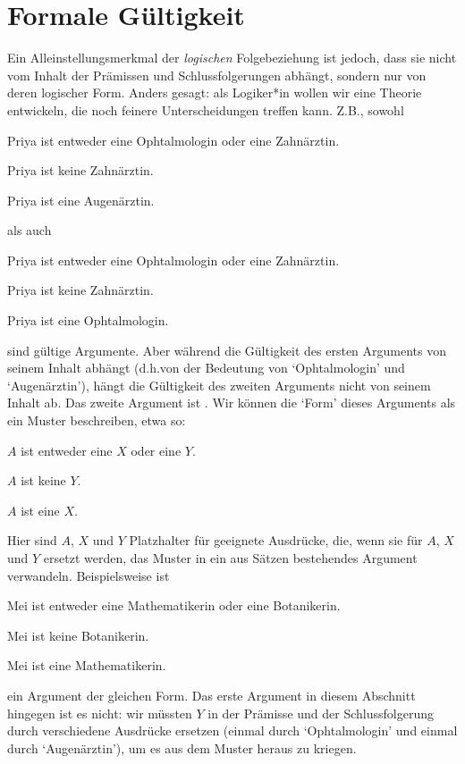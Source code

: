 \section{Formale Gültigkeit}

Ein Alleinstellungsmerkmal der \emph{logischen} Folgebeziehung ist jedoch, dass sie nicht vom Inhalt der Prämissen und Schlussfolgerungen abhängt, sondern nur von deren logischer Form. Anders gesagt: als Logiker*in wollen wir eine Theorie entwickeln, die noch feinere Unterscheidungen treffen kann. Z.B.\@, sowohl
\begin{earg}
	\item[] Priya ist entweder eine Ophtalmologin oder eine Zahnärztin.
	\item[] Priya ist keine Zahnärztin.
	\item[\therefore] Priya ist eine Augenärztin.
\end{earg}
als auch
\begin{earg}
	\item[] Priya ist entweder eine Ophtalmologin oder eine Zahnärztin.
	\item[] Priya ist keine Zahnärztin.
	\item[\therefore] Priya ist eine Ophtalmologin.
\end{earg}
sind gültige Argumente. Aber während die Gültigkeit des ersten Arguments von seinem Inhalt abhängt (d.h.\@ von der Bedeutung von `Ophtalmologin' und `Augenärztin'), hängt die Gültigkeit des zweiten Arguments nicht von seinem Inhalt ab. Das zweite Argument ist . Wir können die `Form' dieses Arguments als ein Muster beschreiben, etwa so:
\begin{earg}
	\item[] $A$ ist entweder eine $X$ oder eine $Y$.
	\item[] $A$ ist keine $Y$.
	\item[\therefore] $A$ ist eine $X$.
\end{earg}
Hier sind $A$, $X$ und $Y$ Platzhalter für geeignete Ausdrücke, die, wenn sie für $A$, $X$ und $Y$ ersetzt werden, das Muster in ein aus Sätzen bestehendes Argument verwandeln. Beispielsweise ist
\begin{earg}
	\item[] Mei ist entweder eine Mathematikerin oder eine Botanikerin.
	\item[] Mei ist keine Botanikerin.
	\item[\therefore] Mei ist eine Mathematikerin.
\end{earg}
ein Argument der gleichen Form. Das erste Argument in diesem Abschnitt hingegen ist es nicht: wir müssten $Y$ in der Prämisse und der Schlussfolgerung durch verschiedene Ausdrücke ersetzen (einmal durch `Ophtalmologin' und einmal durch `Augenärztin'), um es aus dem Muster heraus zu kriegen.

